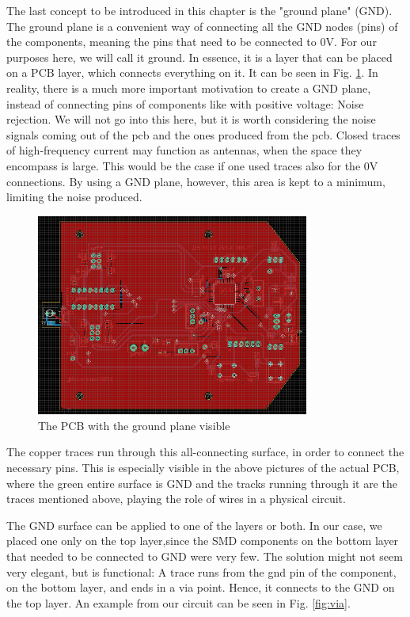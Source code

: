The last concept to be introduced in this chapter is the "ground plane" (GND). The ground plane is a convenient way of connecting all the GND nodes (pins) of the components, meaning the pins that need to be connected to 0V. For our purposes here, we will call it ground. In essence, it is a layer that can be placed on a PCB layer, which connects everything on it. It can be seen in Fig. \ref{fig:gnd}.
In reality, there is a much more important motivation to create a GND plane, instead of connecting pins of components like with positive voltage: Noise rejection. We will not go into this here, but it is worth considering the noise signals coming out of the pcb and the ones produced from the pcb. Closed traces of high-frequency current may function as antennas, when the space they encompass is large. This would be the case if one used traces also for the 0V connections. By using a GND plane, however, this area is kept to a minimum, limiting the noise produced.

\begin{figure}[htb]
    \centering
    \includegraphics[width=0.8\textwidth]{figures/hardware/PCB_Grounded.PNG}
    \caption{The PCB with the ground plane visible}
    \label{fig:gnd}
\end{figure}

\noindent
The copper traces run through this all-connecting surface, in order to connect the necessary pins. This is especially visible in the above pictures of the actual PCB, where the green entire surface is GND and the tracks running through it are the traces mentioned above, playing the role of wires in a physical circuit.

The GND surface can be applied to one of the layers or both. In our case, we placed one only on the top layer,since the SMD components on the bottom layer that needed to be connected to GND were very few. The solution might not seem very elegant, but is functional: A trace runs from the gnd pin of the component, on the bottom layer, and ends in a via point. Hence, it connects to the GND on the top layer. An example from our circuit can be seen in Fig. \ref{fig:via}.

